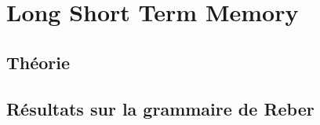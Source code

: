 
\chapter{Long Short Term Memory}

\section{Théorie}

\section{Résultats sur la grammaire de Reber}
